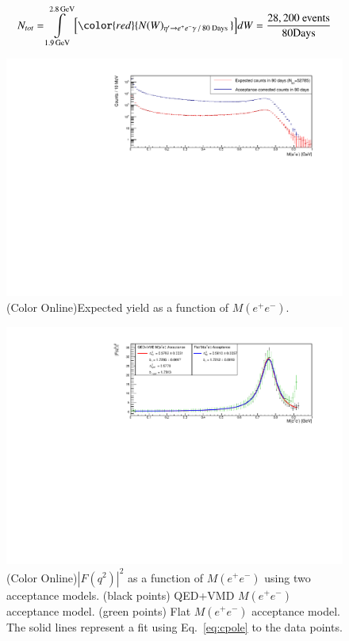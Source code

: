 \documentclass[epj]{webofc}
\def\etaP{\eta^{\prime}}
\def\epem{e^+e^-}
\begin{document}
\begin{equation}
  N_{tot} = \int\limits_{1.9\,\rm{GeV}}^{2.8\,\rm{GeV}} \Big[ {\color{red}{N(W)_{\etaP\rightarrow\epem\gamma\text{ / 80 Days }}}} \Big]dW = \mathrm{\frac{28,200 \ events}{80 Days}}
\label{yield}
\end{equation}

\begin{figure}[h!]\begin{center}
		\includegraphics[width=250 pt, height=155 pt]{figures/counts.pdf}
		\caption[Acceptance as a function of $M(\epem)$]{\label{fig:counts}{(Color Online)Expected yield as a function of $M(\epem)$.}}
	\end{center}\end{figure}

	\begin{figure}[h!]\begin{center}
			\includegraphics[width=225 pt, height=155 pt]{figures/result.pdf}
			\caption[TFF as a function of $M(\epem)$]{\label{fig:results}{(Color Online)$\left|F(q^2)\right|^2$ as a function of $M(\epem)$ using two acceptance models. (black points) QED+VMD $M(\epem)$ acceptance model. (green points) Flat $M(\epem)$ acceptance model. The solid lines represent a fit using Eq.~\ref{eq:cpole} to the data points.}}
		\end{center}\end{figure}
\end{document}
